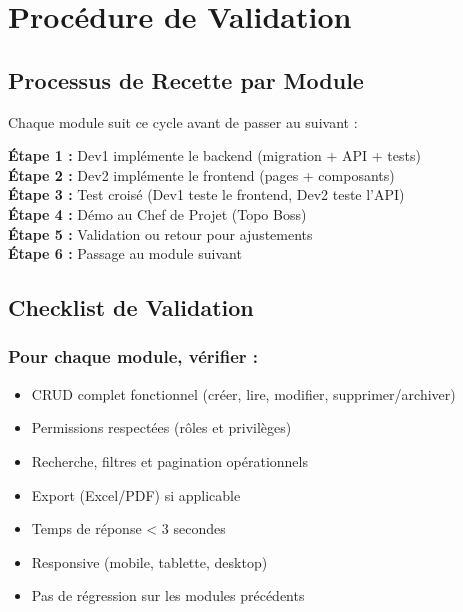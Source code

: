 \documentclass[12pt,a4paper]{report}
\begin{document}
\chapter{Procédure de Validation}

\section{Processus de Recette par Module}

Chaque module suit ce cycle avant de passer au suivant :

\begin{mdframed}[backgroundcolor=lightgray!20, linecolor=primary]
    \textbf{Étape 1 :} Dev1 implémente le backend (migration + API + tests) \\
    \textbf{Étape 2 :} Dev2 implémente le frontend (pages + composants) \\
    \textbf{Étape 3 :} Test croisé (Dev1 teste le frontend, Dev2 teste l'API) \\
    \textbf{Étape 4 :} Démo au Chef de Projet (Topo Boss) \\
    \textbf{Étape 5 :} Validation ou retour pour ajustements \\
    \textbf{Étape 6 :} Passage au module suivant
\end{mdframed}

\section{Checklist de Validation}

\subsection*{Pour chaque module, vérifier :}
\begin{itemize}
    \item CRUD complet fonctionnel (créer, lire, modifier, supprimer/archiver)
    \item Permissions respectées (rôles et privilèges)
    \item Recherche, filtres et pagination opérationnels
    \item Export (Excel/PDF) si applicable
    \item Temps de réponse < 3 secondes
    \item Responsive (mobile, tablette, desktop)
    \item Pas de régression sur les modules précédents
\end{itemize}
\end{document}
